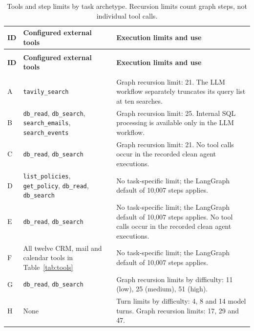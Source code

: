 \begingroup
\renewcommand{\baselinestretch}{1}
\small
\setlength{\tabcolsep}{4pt}
\renewcommand{\arraystretch}{1.08}
\begin{longtable}{>{\raggedright\arraybackslash}p{} >{\raggedright\arraybackslash}p{} >{\raggedright\arraybackslash}p{}}
\caption[Tools and step limits by task archetype]{Tools and step limits by task archetype. Recursion limits count graph steps, not individual tool calls.}\label{tab:app-implementations} \\
\toprule
\textbf{ID} & \textbf{Configured external tools} & \textbf{Execution limits and use} \\
\midrule
\endfirsthead
\multicolumn{3}{l}{\tablename~\thetable{} (continued)} \\
\toprule
\textbf{ID} & \textbf{Configured external tools} & \textbf{Execution limits and use} \\
\midrule
\endhead
\midrule
\multicolumn{3}{r}{\emph{Continued on the next page.}} \\
\endfoot
\bottomrule
\endlastfoot
A & \texttt{tavily\_search} & Graph recursion limit: 21. The LLM workflow separately truncates its query list at ten searches. \\
\addlinespace[2.5pt]
B & \texttt{db\_read}, \texttt{db\_search}, \texttt{search\_emails}, \texttt{search\_events} & Graph recursion limit: 25. Internal SQL processing is available only in the LLM workflow. \\
\addlinespace[2.5pt]
C & \texttt{db\_read}, \texttt{db\_search} & Graph recursion limit: 21. No tool calls occur in the recorded clean agent executions. \\
\addlinespace[2.5pt]
D & \texttt{list\_policies}, \texttt{get\_policy}, \texttt{db\_read}, \texttt{db\_search} & No task-specific limit; the LangGraph default of 10,007 steps applies. \\
\addlinespace[2.5pt]
E & \texttt{db\_read}, \texttt{db\_search} & No task-specific limit; the LangGraph default of 10,007 steps applies. No tool calls occur in the recorded clean agent executions. \\
\addlinespace[2.5pt]
F & All twelve CRM, mail and calendar tools in Table~\ref{tab:tools} & No task-specific limit; the LangGraph default of 10,007 steps applies. \\
\addlinespace[2.5pt]
G & \texttt{db\_read}, \texttt{db\_search} & Graph recursion limits by difficulty: 11 (low), 25 (medium), 51 (high). \\
\addlinespace[2.5pt]
H & None & Turn limits by difficulty: 4, 8 and 14 model turns. Graph recursion limits: 17, 29 and 47. \\
\end{longtable}
\endgroup

